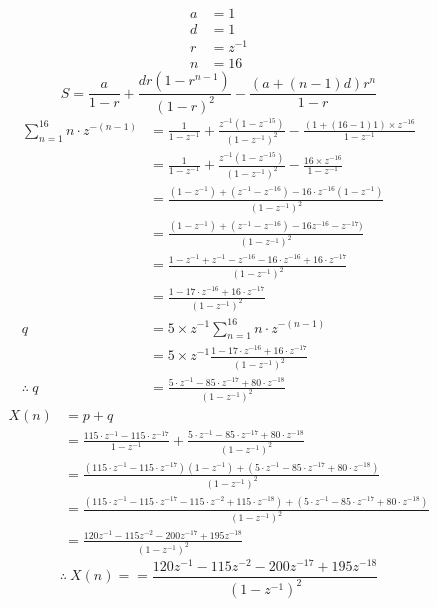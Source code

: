 \documentclass[journal,12pt,onecolumn]{IEEEtran}
\theoremstyle{remark}
\begin{document}
\[
\begin{aligned}
 a&=1\\
 d&=1\\
 r&=z^{-1}\\
 n&=16
\end{aligned}
\]
\[ S= \frac{a}{1 - r} + \frac{dr(1 - r^{n-1})}{(1 - r)^2}-\frac{(a+(n-1)d) r^{n}}{1-r} \]
\[
\begin{aligned}
   \sum_{n=1}^{16}n\cdot z^{-(n-1)}&= \frac{1}{1 - z^{-1} }+ \frac{z^{-1}(1 - z^{-15})}{(1 - z^{-1})^2}-\frac{(1+(16-1)1)\times z^{-16}}{1-z^{-1}} \\
&=\frac{1}{1 - z^{-1} }+ \frac{z^{-1}(1 - z^{-15})}{(1 - z^{-1})^2}-\frac{16\times z^{-16}}{1-z^{-1}}\\
&=\frac{(1-z^{-1})+(z^{-1}-z^{-16})-16\cdot z^{-16}(1-z^{-1})}{(1-z^{-1})^{2}}\\
&=\frac{(1-z^{-1})+(z^{-1}-z^{-16})-16z^{-16}-z^{-17})}{(1-z^{-1})^{2}}\\
&=\frac{1-z^{-1}+z^{-1}-z^{-16}-16\cdot z^{-16}+16\cdot z^{-17}}{(1-z^{-1})^{2}}\\
&=\frac{1-17\cdot z^{-16}+16\cdot z^{-17}}{(1-z^{-1})^{2}}\\
q&=5\times z^{-1}\sum_{n=1}^{16}n\cdot z^{-(n-1)}\\
&=5\times z^{-1}\frac{1-17\cdot z^{-16}+16\cdot z^{-17}}{(1-z^{-1})^{2}}\\
\therefore \ q&=\frac{5\cdot z^{-1}-85\cdot z^{-17}+80\cdot z^{-18}}{(1-z^{-1})^{2}}
\end{aligned}
\]
\[
\begin{aligned}
   X(n)&=p+q\\
   &=\frac{115\cdot z^{-1}-115\cdot z^{-17}}{1-z^{-1}}+\frac{5\cdot z^{-1}-85\cdot z^{-17}+80\cdot z^{-18}}{(1-z^{-1})^{2}}\\
   &=\frac{(115\cdot z^{-1}-115\cdot z^{-17})(1-z^{-1})+(5\cdot z^{-1}-85\cdot z^{-17}+80\cdot z^{-18})}{(1-z^{-1})^2}\\
   &=\frac{(115\cdot z^{-1}-115\cdot z^{-17}-115\cdot z^{-2}+115\cdot z^{-18})+(5\cdot z^{-1}-85\cdot z^{-17}+80\cdot z^{-18})}{(1-z^{-1})^2}\\
   &=\frac{120 z^{-1}-115 z^{-2}-200 z^{-17}+195 z^{-18}}{(1-z^{-1})^2}
\end{aligned}
\]
\[\therefore \ X(n)==\frac{120 z^{-1}-115 z^{-2}-200 z^{-17}+195 z^{-18}}{(1-z^{-1})^2}\]
\end{document}
